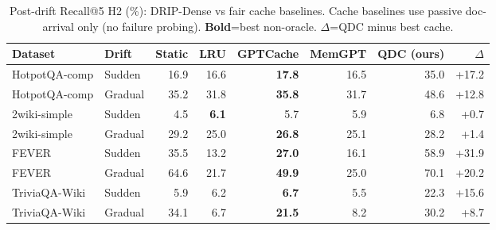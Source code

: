 \begin{table}[t]
\centering
\small
\caption{Post-drift Recall@5 H2 (\%): DRIP-Dense vs fair cache baselines. Cache baselines use passive doc-arrival only (no failure probing). \textbf{Bold}=best non-oracle. $\Delta$=QDC minus best cache.}
\label{tab:h2_comparison}
\setlength{\tabcolsep}{4pt}
\begin{tabular}{llrrrrrr}
\toprule
Dataset & Drift & Static & LRU & GPTCache & MemGPT & \textbf{QDC (ours)} & $\Delta$ \\
\midrule
  HotpotQA-comp & Sudden & 16.9 & 16.6 & \textbf{17.8} & 16.5 & 35.0 & +17.2 \\
  HotpotQA-comp & Gradual & 35.2 & 31.8 & \textbf{35.8} & 31.7 & 48.6 & +12.8 \\
  \midrule
  2wiki-simple & Sudden & 4.5 & \textbf{6.1} & 5.7 & 5.9 & 6.8 & +0.7 \\
  2wiki-simple & Gradual & 29.2 & 25.0 & \textbf{26.8} & 25.1 & 28.2 & +1.4 \\
  \midrule
  FEVER & Sudden & 35.5 & 13.2 & \textbf{27.0} & 16.1 & 58.9 & +31.9 \\
  FEVER & Gradual & 64.6 & 21.7 & \textbf{49.9} & 25.0 & 70.1 & +20.2 \\
  \midrule
  TriviaQA-Wiki & Sudden & 5.9 & 6.2 & \textbf{6.7} & 5.5 & 22.3 & +15.6 \\
  TriviaQA-Wiki & Gradual & 34.1 & 6.7 & \textbf{21.5} & 8.2 & 30.2 & +8.7 \\
\bottomrule
\end{tabular}
\end{table}
